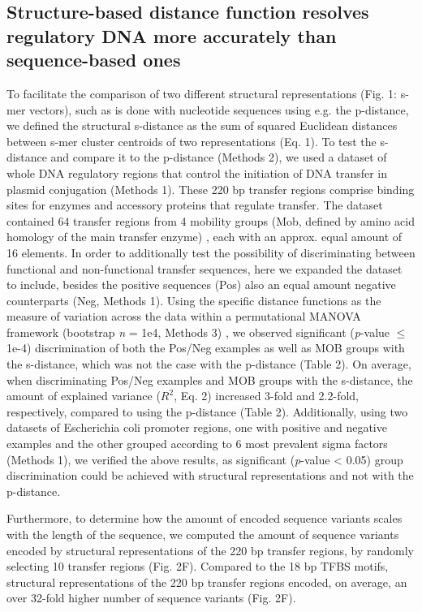 \documentclass[sigconf]{acmart}
\begin{document}
\subsection{Structure-based distance function resolves regulatory DNA more accurately than sequence-based ones}
To facilitate the comparison of two different structural representations (Fig. 1: s-mer vectors), such as is done with nucleotide sequences using e.g. the p-distance, we defined the structural s-distance as the sum of squared Euclidean distances between s-mer cluster centroids of two representations (Eq. 1). To test the s-distance and compare it to the p-distance (Methods 2), we used a dataset of whole DNA regulatory regions that control the initiation of DNA transfer in plasmid conjugation \cite{Garcillan-Barcia2009-yk} (Methods 1). These 220 bp transfer regions comprise binding sites for enzymes and accessory proteins that regulate transfer. The dataset contained 64 transfer regions \cite{Zrimec2018-lx} from 4 mobility groups (Mob, defined by amino acid homology of the main transfer enzyme) \cite{Garcillan-Barcia2009-yk}, each with an approx. equal amount of 16 elements. In order to additionally test the possibility of discriminating between functional and non-functional transfer sequences, here we expanded the dataset to include, besides the positive sequences (Pos) also an equal amount negative counterparts (Neg, Methods 1). Using the specific distance functions as the measure of variation across the data within a permutational MANOVA framework (bootstrap \textit{n} = 1e4, Methods 3) \cite{Anderson2001-zz}, we observed significant (\textit{p}-value \(\leq\) 1e-4) discrimination of both the Pos/Neg examples as well as MOB groups with the s-distance, which was not the case with the p-distance (Table 2). On average, when discriminating Pos/Neg examples and MOB groups with the s-distance, the amount of explained variance ($R^2$, Eq. 2) increased 3-fold and 2.2-fold, respectively, compared to using the p-distance (Table 2). Additionally, using two datasets of Escherichia coli promoter regions, one with positive and negative examples \cite{Gusmao2014-hp} and the other grouped according to 6 most prevalent sigma factors \cite{Watson2008-dt} (Methods 1), we verified the above results, as significant (\textit{p}-value < 0.05) group discrimination could be achieved with structural representations and not with the p-distance.

Furthermore, to determine how the amount of encoded sequence variants scales with the length of the sequence, we computed the amount of sequence variants encoded by structural representations of the 220 bp transfer regions, by randomly selecting 10 transfer regions (Fig. 2F). Compared to the 18 bp TFBS motifs, structural representations of the 220 bp transfer regions encoded, on average, an over 32-fold higher number of sequence variants (Fig. 2F).
\end{document}
